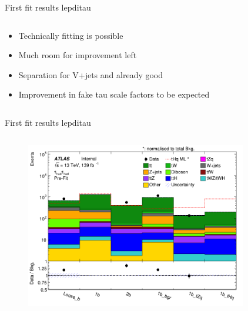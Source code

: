 \begin{frame}{First fit results lepditau}
\begin{columns}
\begin{column}{0.5\textwidth}
\begin{figure}
            \end{figure}
            \begin{itemize}
                \item Technically fitting is possible
                \item Much room for improvement left
                \item Separation for V+jets and \ttbar already good
                \item Improvement in fake tau scale factors to be expected
            \end{itemize}
        \end{column}
    \end{columns}
\end{frame}

\begin{frame}{First fit results lepditau}
    \begin{columns}
        \begin{column}{0.5\textwidth}
            \begin{figure}
                \centering
                \includegraphics[width=\textwidth]{prefit_hadhad}
            \end{figure}
        \end{column}
        \begin{column}{0.5\textwidth}
            \begin{figure}
                \centering

\end{figure}
\end{column}
\end{columns}
\end{frame}
